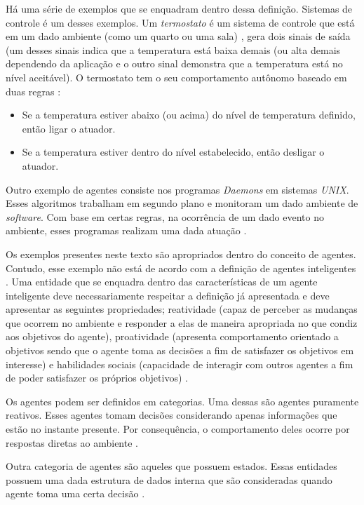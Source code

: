 Há uma série de exemplos que se enquadram dentro dessa definição. Sistemas de controle é um desses exemplos. Um \textit{termostato} é um sistema de controle que está em um dado ambiente (como um quarto ou uma sala) \cite{whatisagent}, gera dois sinais de saída (um desses sinais indica que a temperatura está baixa demais (ou alta demais dependendo da aplicação e o outro sinal
demonstra que a temperatura está no nível aceitável). O termostato tem o seu comportamento autônomo baseado em duas regras \cite{whatisagent}:

\begin{itemize}
    \item Se a temperatura estiver abaixo (ou acima) do nível de temperatura definido, então ligar o atuador.
    \item Se a temperatura estiver dentro do nível estabelecido, então desligar o atuador.
\end{itemize}

Outro exemplo de agentes consiste nos programas \textit{Daemons} em sistemas \textit{UNIX}. Esses algoritmos trabalham em segundo plano e monitoram um dado ambiente de \textit{software}. Com base em certas regras, na ocorrência de um dado evento no ambiente, esses programas realizam uma dada atuação \cite{whatisagent}.   

Os exemplos presentes neste texto são apropriados dentro do conceito de agentes. Contudo, esse exemplo não está de acordo com a definição de agentes inteligentes \cite{whatisagent}. Uma entidade que se enquadra dentro das características de um agente inteligente deve necessariamente respeitar a definição já apresentada e deve apresentar as seguintes propriedades; reatividade (capaz de perceber as mudanças
que ocorrem no ambiente e responder a elas de maneira apropriada no que condiz aos objetivos do agente), proatividade (apresenta comportamento orientado a objetivos sendo que o agente toma as decisões a fim de satisfazer os objetivos em interesse) e habilidades sociais (capacidade de interagir com outros agentes a fim de poder satisfazer os próprios objetivos) \cite{whatisagent} \cite{artificialinteligencemodermapproach}.

Os agentes podem ser definidos em categorias. Uma dessas são agentes puramente reativos. Esses agentes tomam decisões considerando apenas informações que estão no instante presente. Por consequência, o comportamento deles ocorre por respostas diretas ao ambiente \cite{whatisagent}. 

Outra categoria de agentes são aqueles que possuem estados. Essas entidades possuem uma dada estrutura de dados interna que são consideradas quando agente toma uma certa decisão \cite{whatisagent}.

